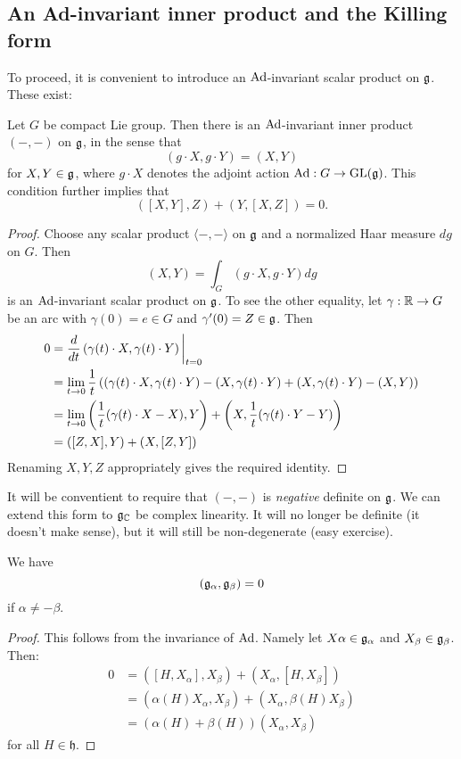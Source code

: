 \documentclass[11pt, english]{article}
\begin{document}
\subsection{An Ad-invariant inner product and the Killing form}

To proceed, it is convenient to introduce an $\operatorname{Ad}$-invariant scalar product on $\mathfrak g$. These exist:

\begin{lemma}
Let $G$ be compact Lie group. Then there is an $\operatorname{Ad}$-invariant inner product $( -,-)$ on $\mathfrak g$, in the sense that $$( g \cdot X, g\cdot Y )  = (X , Y )$$
for $X,Y \in \mathfrak g$, where $g \cdot X$ denotes the adjoint action $\operatorname{Ad}:G \to \operatorname{GL}(\mathfrak g)$. This condition further implies that
$$
( [X,Y],Z )  +(Y,[X,Z]) = 0.
$$
\end{lemma}
\begin{proof}
 Choose any scalar product $\langle -,-\rangle $ on $\mathfrak g$ and a normalized Haar measure $dg$ on $G$. Then 
$$
(X,Y ) = \int_G (g \cdot X, g\cdot Y) dg
$$
is an $\operatorname{Ad}$-invariant scalar product on $\mathfrak g$. To see the other equality, let $\gamma:\mathbb{R} \to G$ be an arc with $\gamma(0)=e \in G$ and $\gamma'(0)=Z \in \mathfrak g$. Then
\begin{align*}
0 &=   \restr{\frac{d}{dt}\left( \gamma(t) \cdot X, \gamma(t) \cdot Y \right)}{t = 0} \\
 &= \lim_{t \to 0} \frac 1t \left(( \gamma(t) \cdot X, \gamma(t) \cdot Y ) - ( X, \gamma(t) \cdot  Y ) + ( X, \gamma(t) \cdot Y ) - ( X, Y ) \right) \\
&= \lim_{t \to 0} \left( \frac 1t (\gamma(t) \cdot X - X), Y \right) + \left( X, \frac 1t (\gamma(t) \cdot Y - Y) \right) \\
&= ( [Z,X],Y ) + ( X, [Z,Y])
\end{align*}
Renaming $X,Y,Z$ appropriately gives the required identity.
\end{proof}

It will be conventient to require that $( -,- )$ is \emph{negative} definite on $\mathfrak g$. We can extend this form to $\mathfrak g_{\mathbb{C}}$ be complex linearity. It will no longer be definite (it doesn't make sense), but it will still be non-degenerate (easy exercise). 

\begin{lemma}
We have
$$
(\mathfrak g_\alpha, \mathfrak g_\beta ) = 0
$$
if $\alpha \neq -\beta$.
\end{lemma}
\begin{proof}
This follows from the invariance of $\operatorname{Ad}$. Namely let $X \alpha \in \mathfrak g_\alpha$ and $X_\beta \in \mathfrak g_\beta$. Then:
\begin{align*}
  0 &= ([H,X_\alpha],X_\beta ) + (X_\alpha,[H,X_\beta]) \\
&= (\alpha(H)X_\alpha, X_\beta) + (X_\alpha,\beta(H)X_\beta) \\
&= (\alpha(H)+\beta(H)) (X_\alpha,X_\beta)
\end{align*}
for all $H \in \mathfrak h$.
\end{proof}
\end{document}
